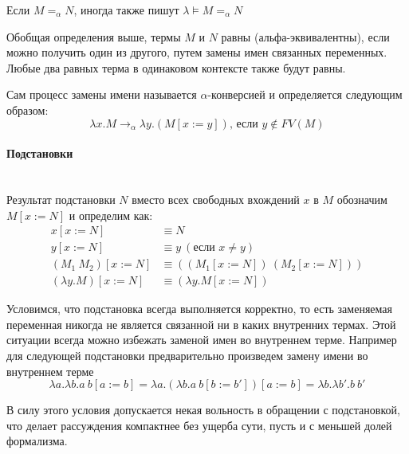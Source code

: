 \documentclass[lambda.tex]{subfiles}
\begin{document}
Если $M =_\alpha N$, иногда также пишут $\lambda\models M =_\alpha N$


Обобщая определения выше, термы $M$ и $N$ равны (альфа-эквивалентны), если можно получить один из другого, путем замены имен связанных переменных. Любые два равных терма в одинаковом контексте также будут равны.

Сам процесс замены имени называется $\alpha$-конверсией и определяется следующим образом:
\begin{equation*}
	\lambda x.M \rightarrow_\alpha \lambda y.(M[x := y]) \text {, если } y \not\in FV(M)\tag{$\alpha$}
\end{equation*}

\newpage
\paragraph{Подстановки} %
\label{par:substitution}~\\

Результат подстановки $N$ вместо всех свободных вхождений $x$ в $M$ обозначим $M[x := N]$ и определим как:
\begin{align*}
	x[x := N] &\equiv N\\
	y[x := N] &\equiv y\ (\text{если } x \neq y)\\
	(M_1 \ M_2 )[x := N] &\equiv ((M_1 [x := N])\ (M_2 [x := N]))\\
	(\lambda y.M)[x := N] &\equiv (\lambda y.M[x := N])
\end{align*}


Условимся, что подстановка всегда выполняется корректно, то есть заменяемая переменная никогда не является связанной ни в каких внутренних термах. Этой ситуации всегда можно избежать заменой имен во внутреннем терме. Например для следующей подстановки предварительно произведем замену имени во внутреннем терме
\[\lambda a.\lambda b.a\ b[a := b] = \lambda a.(\lambda b.a\ b[b := b'])[a := b] = \lambda b.\lambda b'.b\ b'\]

В силу этого условия допускается некая вольность в обращении с подстановкой, что делает рассуждения компактнее без ущерба сути, пусть и с меньшей долей формализма.
\end{document}
